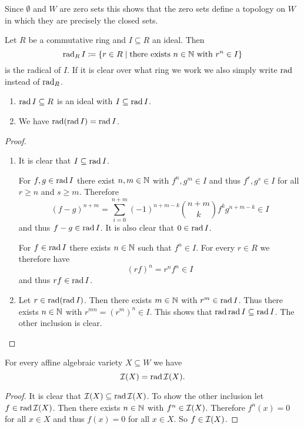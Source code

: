 \begin{rem}
 Since $\emptyset$ and $W$ are zero sets this shows that the zero sets define a topology on $W$ in which they are precisely the closed sets.
\end{rem}


\begin{defi}
 Let $R$ be a commutative ring and $I \subseteq R$ an ideal. Then
 \[
  \operatorname{rad}_R I \coloneqq \{r \in R \mid \text{there exists } n \in \mathbb{N} \text{ with } r^n \in I\}
 \]
 is the radical of $I$. If it is clear over what ring we work we also simply write $\operatorname{rad}$ instead of $\operatorname{rad}_R$.
\end{defi}


\begin{lem}
 \begin{enumerate}[label=\emph{\alph*)},leftmargin=*]
  Let $R$ be a commutative ring and $I \subseteq R$ an ideal. 
  \item
   $\operatorname{rad} I  \subseteq R$ is an ideal with $I \subseteq \operatorname{rad} I$.
  \item
   We have $\operatorname{rad}(\operatorname{rad} I) = \operatorname{rad} I$.
 \end{enumerate}
\end{lem}
\begin{proof}
 \begin{enumerate}[label=\emph{\alph*)},leftmargin=*]
  \item
   It is clear that $I \subseteq \operatorname{rad} I$.
   
   For $f,g \in \operatorname{rad} I$ there exist $n,m \in \mathbb{N}$ with $f^n, g^m \in I$ and thus $f^r, g^s \in I$ for all $r \geq n$ and $s \geq m$. Therefore
   \[
    (f-g)^{n+m} = \sum_{i=0}^{n+m} (-1)^{n+m-k} \binom{n+m}{k} f^k g^{n+m-k} \in I
   \]
   and thus $f-g \in \operatorname{rad} I$. It is also clear that $0 \in \operatorname{rad} I$.
   
   For $f \in \operatorname{rad} I$ there exists $n \in \mathbb{N}$ such that $f^n \in I$. For every $r \in R$ we therefore have
   \[
    (rf)^n = r^n f^n \in I
   \]
   and thus $rf \in \operatorname{rad} I$.
  \item
   Let $r \in \operatorname{rad}(\operatorname{rad} I)$. Then there exists $m \in \mathbb{N}$ with $r^m \in \operatorname{rad} I$. Thus there exists $n \in \mathbb{N}$ with $r^{mn} = (r^m)^n \in I$. This shows that $\operatorname{rad} \operatorname{rad} I \subseteq \operatorname{rad} I$. The other inclusion is clear.
  \qedhere
 \end{enumerate}
\end{proof}


\begin{lem}
 For every affine algebraic variety $X \subseteq W$ we have
 \[
 \mathcal{I}(X) = \operatorname{rad} \mathcal{I}(X).
 \]
\end{lem}
\begin{proof}
 It is clear that $\mathcal{I}(X) \subseteq \operatorname{rad} \mathcal{I}(X)$. To show the other inclusion let \mbox{$f \in \operatorname{rad} \mathcal{I}(X)$}. Then there exists $n \in \mathbb{N}$ with $f^n \in \mathcal{I}(X)$. Therefore $f^n(x) = 0$ for all $x \in X$ and thus $f(x) = 0$ for all $x \in X$. So $f \in \mathcal{I}(X)$.
\end{proof}



